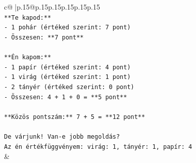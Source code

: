 \documentclass{article}
\begin{document}
{\begin{supertabular}{c@{$\;$}|p{.15\linewidth}@{}p{.15\linewidth}p{.15\linewidth}p{.15\linewidth}p{.15\linewidth}p{.15\linewidth}}
{{{\\ 
\texttt{**Te kapod:**} \\
\texttt{{-}   1 pohár (értéked szerint: 7 pont)} \\
\texttt{{-}   Összesen: **7 pont**} \\
\\ 
\texttt{**Én kapom:**} \\
\texttt{{-}   1 papír (értéked szerint: 4 pont)} \\
\texttt{{-}   1 virág (értéked szerint: 1 pont)} \\
\texttt{{-}   2 tányér (értéked szerint: 0 pont)} \\
\texttt{{-}   Összesen: 4 + 1 + 0 = **5 pont**} \\
\\ 
\texttt{**Közös pontszám:** 7 + 5 = **12 pont**} \\
\\ 
\texttt{De várjunk! Van{-}e jobb megoldás?} \\
\texttt{Az én értékfüggvényem: virág: 1, tányér: 1, papír: 4} \\
            }
        }
    }
    & \\ \\


\end{supertabular}}
\end{document}

